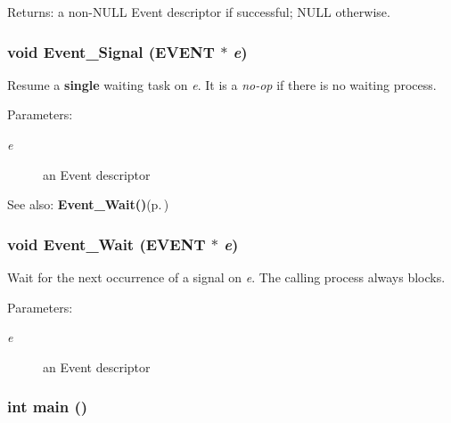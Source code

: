 \begin{Desc}
\item[Returns:]a non-NULL Event descriptor if successful; NULL otherwise. \end{Desc}
\subsubsection{\setlength{\rightskip}{0pt plus 5cm}void Event\_\-Signal ({\bf EVENT} $\ast$ {\em e})}\label{os_8c_39210e081be158dab105c68cb85585cd}


Resume a {\bf single} waiting task on {\em e\/}. It is a {\em no-op\/} if there is no waiting process. 

\begin{Desc}
\item[Parameters:]
\begin{description}
\item[{\em e}]an Event descriptor\end{description}
\end{Desc}
\begin{Desc}
\item[See also:]{\bf Event\_\-Wait()}{\rm (p.\,\pageref{os_8c_e279428ffa0e59261a01899cea931503})} \end{Desc}
\subsubsection{\setlength{\rightskip}{0pt plus 5cm}void Event\_\-Wait ({\bf EVENT} $\ast$ {\em e})}\label{os_8c_e279428ffa0e59261a01899cea931503}


Wait for the next occurrence of a signal on {\em e\/}. The calling process always blocks. 

\begin{Desc}
\item[Parameters:]
\begin{description}
\item[{\em e}]an Event descriptor \end{description}
\end{Desc}
\subsubsection{\setlength{\rightskip}{0pt plus 5cm}int main ()}\label{os_8c_e66f6b31b5ad750f1fe042a706a4e3d4}


